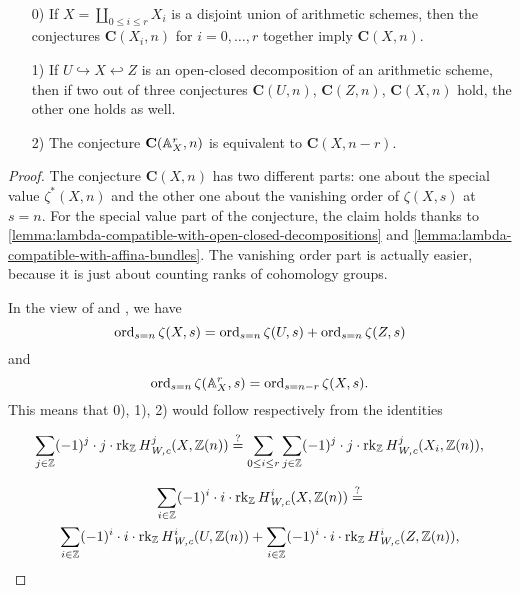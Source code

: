\begin{theorem}
  \label{thm:compatibility-for-conjecture-C} ~

  \begin{enumerate}
  \item[0)] If $X = \coprod_{0 \le i \le r} X_i$ is a disjoint union of
    arithmetic schemes, then the conjectures $\mathbf{C} (X_i, n)$ for
    $i = 0,\ldots,r$ together imply $\mathbf{C} (X, n)$.

  \item[1)] If $U \hookrightarrow X \hookleftarrow Z$ is an open-closed
    decomposition of an arithmetic scheme, then if two out of three conjectures
    $\mathbf{C} (U, n)$, $\mathbf{C} (Z, n)$, $\mathbf{C} (X, n)$ hold, the
    other one holds as well.

  \item[2)] The conjecture $\mathbf{C} (\AA^r_X,n)$ is equivalent to
    $\mathbf{C} (X,n-r)$.
  \end{enumerate}

  \begin{proof}
    The conjecture $\mathbf{C} (X, n)$ has two different parts: one about the
    special value $\zeta^* (X,n)$ and the other one about the vanishing order of
    $\zeta (X,s)$ at $s = n$. For the special value part of the conjecture, the
    claim holds thanks to
    \ref{lemma:lambda-compatible-with-open-closed-decompositions} and
    \ref{lemma:lambda-compatible-with-affina-bundles}. The vanishing order part
    is actually easier, because it is just about counting ranks of cohomology
    groups.

    In the view of 
    and , we have
    $$\ord_{s=n} \zeta (X,s) = \ord_{s=n} \zeta (U,s) + \ord_{s=n} \zeta (Z,s)$$
    and
    $$\ord_{s=n} \zeta (\AA^r_X,s) = \ord_{s=n-r} \zeta (X,s).$$
    This means that 0), 1), 2) would follow respectively from the identities

    \begin{equation}
      \label{eqn:vanishing-order-identity-for-disjoint-unions}
      \sum_{j\in\ZZ} (-1)^j \cdot j \cdot \rk_\ZZ H^j_\text{\it W,c} (X, \ZZ (n))
      \stackrel{?}{=}
      \sum_{0 \le i \le r} \sum_{j\in\ZZ} (-1)^j \cdot j \cdot \rk_\ZZ H^j_\text{\it W,c} (X_i, \ZZ (n)),
    \end{equation}

    \begin{multline}
      \label{eqn:vanishing-order-identity-for-open-closed-decompositions}
      \sum_{i\in\ZZ} (-1)^i \cdot i \cdot \rk_\ZZ H^i_\text{\it W,c} (X, \ZZ (n)) \stackrel{?}{=} \\
      \sum_{i\in\ZZ} (-1)^i \cdot i \cdot \rk_\ZZ H^i_\text{\it W,c} (U, \ZZ (n)) +
      \sum_{i\in\ZZ} (-1)^i \cdot i \cdot \rk_\ZZ H^i_\text{\it W,c} (Z, \ZZ (n)),
    \end{multline}


\end{proof}
\end{theorem}

